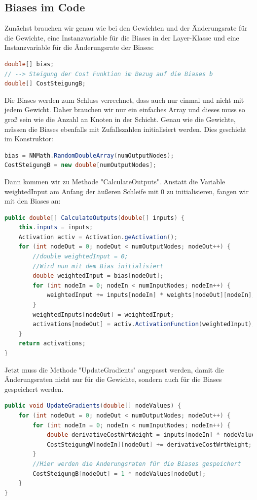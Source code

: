 \documentclass[12pt]{article}
\begin{document}
\subsection{Biases im Code}
Zunächst brauchen wir genau wie bei den Gewichten und der Änderungsrate für die Gewichte, eine Instanzvariable für die Biases in der Layer-Klasse und eine Instanzvariable für die Änderungsrate der Biases:
\begin{lstlisting}[language=Java]
double[] bias;
// --> Steigung der Cost Funktion im Bezug auf die Biases b
double[] CostSteigungB;
\end{lstlisting}
Die Biases werden zum Schluss verrechnet, dass auch nur einmal und nicht mit jedem Gewicht. Daher brauchen wir nur ein einfaches Array und dieses muss so groß sein wie die Anzahl an Knoten in der Schicht. Genau wie die Gewichte, müssen die Biases ebenfalls mit Zufallszahlen initialisiert werden. Dies geschieht im Konstruktor:\begin{lstlisting}[language=Java]
bias = NNMath.RandomDoubleArray(numOutputNodes);
CostSteigungB = new double[numOutputNodes];
\end{lstlisting}
Dann kommen wir zu Methode "CalculateOutputs". Anstatt die Variable weightedInput am Anfang der äußeren Schleife mit 0 zu initialisieren, fangen wir mit den Biases an:
\begin{lstlisting}[language=Java]
public double[] CalculateOutputs(double[] inputs) {
    this.inputs = inputs;
    Activation activ = Activation.geActivation();
    for (int nodeOut = 0; nodeOut < numOutputNodes; nodeOut++) {
        //double weightedInput = 0;
        //Wird nun mit dem Bias initialisiert
        double weightedInput = bias[nodeOut];
        for (int nodeIn = 0; nodeIn < numInputNodes; nodeIn++) {
            weightedInput += inputs[nodeIn] * weights[nodeOut][nodeIn];
        }
        weightedInputs[nodeOut] = weightedInput;
        activations[nodeOut] = activ.ActivationFunction(weightedInput);
    }
    return activations;
}
\end{lstlisting}
Jetzt muss die Methode "UpdateGradients" angepasst werden, damit die Änderungsraten nicht nur für die Gewichte, sondern auch für die Biases gespeichert werden.
\begin{lstlisting}[language=Java]
public void UpdateGradients(double[] nodeValues) {
    for (int nodeOut = 0; nodeOut < numOutputNodes; nodeOut++) {
        for (int nodeIn = 0; nodeIn < numInputNodes; nodeIn++) {
            double derivativeCostWrtWeight = inputs[nodeIn] * nodeValues[nodeOut];
            CostSteigungW[nodeIn][nodeOut] += derivativeCostWrtWeight;
        }
        //Hier werden die Anderungsraten für die Biases gespeichert
        CostSteigungB[nodeOut] = 1 * nodeValues[nodeOut];
    }
}
\end{lstlisting}
\end{document}
